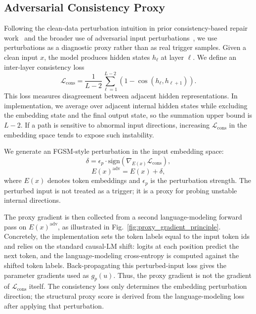 \documentclass[lettersize,journal]{IEEEtran}
\begin{document}
\subsection{Adversarial Consistency Proxy}
Following the clean-data perturbation intuition in prior consistency-based repair work~\cite{crow} and the broader use of adversarial input perturbations~\cite{fgsm,pgd}, we use perturbations as a diagnostic proxy rather than as real trigger samples.
Given a clean input $x$, the model produces hidden states $h_\ell$ at layer $\ell$. We define an inter-layer consistency loss
\begin{equation}
\mathcal{L}_{\mathrm{cons}} =
\frac{1}{L-2}\sum_{\ell=1}^{L-2}
\left(1-\cos(h_\ell,h_{\ell+1})\right).
\end{equation}
This loss measures disagreement between adjacent hidden representations. In implementation, we average over adjacent internal hidden states while excluding the embedding state and the final output state, so the summation upper bound is $L-2$. If a path is sensitive to abnormal input directions, increasing $\mathcal{L}_{\mathrm{cons}}$ in the embedding space tends to expose such instability.

We generate an FGSM-style perturbation in the input embedding space:
\begin{equation}
\delta =
\epsilon_p \cdot
\mathrm{sign}\left(\nabla_{E(x)} \mathcal{L}_{\mathrm{cons}}\right),
\end{equation}
\begin{equation}
E(x)^{\mathrm{adv}} = E(x)+\delta,
\end{equation}
where $E(x)$ denotes token embeddings and $\epsilon_p$ is the perturbation strength. The perturbed input is not treated as a trigger; it is a proxy for probing unstable internal directions.

The proxy gradient is then collected from a second language-modeling forward pass on $E(x)^{\mathrm{adv}}$, as illustrated in Fig.~\ref{fig:proxy_gradient_principle}. Concretely, the implementation sets the token labels equal to the input token ids and relies on the standard causal-LM shift: logits at each position predict the next token, and the language-modeling cross-entropy is computed against the shifted token labels. Back-propagating this perturbed-input loss gives the parameter gradients used as $g_p(u)$. Thus, the proxy gradient is not the gradient of $\mathcal{L}_{\mathrm{cons}}$ itself. The consistency loss only determines the embedding perturbation direction; the structural proxy score is derived from the language-modeling loss after applying that perturbation.
\end{document}
